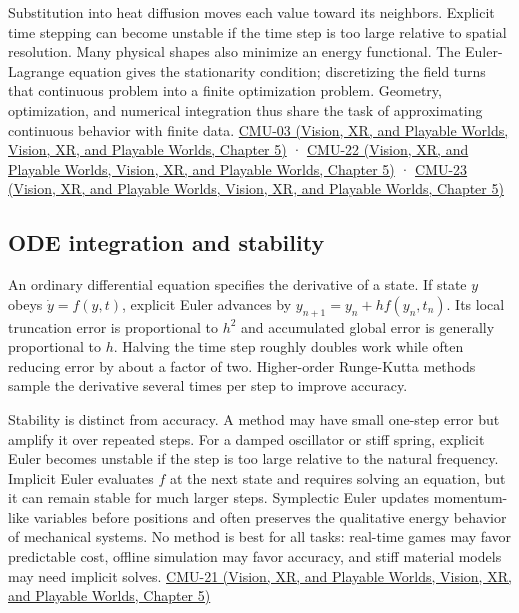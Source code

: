 Substitution into heat diffusion moves each value toward its neighbors. Explicit time stepping can become unstable if the time step is too large relative to spatial resolution. Many physical shapes also minimize an energy functional. The Euler-Lagrange equation gives the stationarity condition; discretizing the field turns that continuous problem into a finite optimization problem. Geometry, optimization, and numerical integration thus share the task of approximating continuous behavior with finite data. \href{../07-Vision-XR-and-Playable-Worlds/main.pdf\#nameddest=04-visual-computing-ii-ch036-cmu-03---vector-calculus-preview}{CMU-03 (Vision, XR, and Playable Worlds, Vision, XR, and Playable Worlds, Chapter 5)} · \href{../07-Vision-XR-and-Playable-Worlds/main.pdf\#nameddest=04-visual-computing-ii-ch036-cmu-22---optimization}{CMU-22 (Vision, XR, and Playable Worlds, Vision, XR, and Playable Worlds, Chapter 5)} · \href{../07-Vision-XR-and-Playable-Worlds/main.pdf\#nameddest=04-visual-computing-ii-ch036-cmu-23---physically-based-animation-and-pdes}{CMU-23 (Vision, XR, and Playable Worlds, Vision, XR, and Playable Worlds, Chapter 5)}

\subsection{ODE integration and stability}\label{04-visual-computing-ii-ch029-ode-integration-and-stability}

An ordinary differential equation specifies the derivative of a state. If state \(y\) obeys \(\dot y=f(y,t)\), explicit Euler advances by \(y_{n+1}=y_n+h f(y_n,t_n)\). Its local truncation error is proportional to \(h^2\) and accumulated global error is generally proportional to \(h\). Halving the time step roughly doubles work while often reducing error by about a factor of two. Higher-order Runge-Kutta methods sample the derivative several times per step to improve accuracy.

Stability is distinct from accuracy. A method may have small one-step error but amplify it over repeated steps. For a damped oscillator or stiff spring, explicit Euler becomes unstable if the step is too large relative to the natural frequency. Implicit Euler evaluates \(f\) at the next state and requires solving an equation, but it can remain stable for much larger steps. Symplectic Euler updates momentum-like variables before positions and often preserves the qualitative energy behavior of mechanical systems. No method is best for all tasks: real-time games may favor predictable cost, offline simulation may favor accuracy, and stiff material models may need implicit solves. \href{../07-Vision-XR-and-Playable-Worlds/main.pdf\#nameddest=04-visual-computing-ii-ch036-cmu-21---dynamics-and-time-integration}{CMU-21 (Vision, XR, and Playable Worlds, Vision, XR, and Playable Worlds, Chapter 5)}

